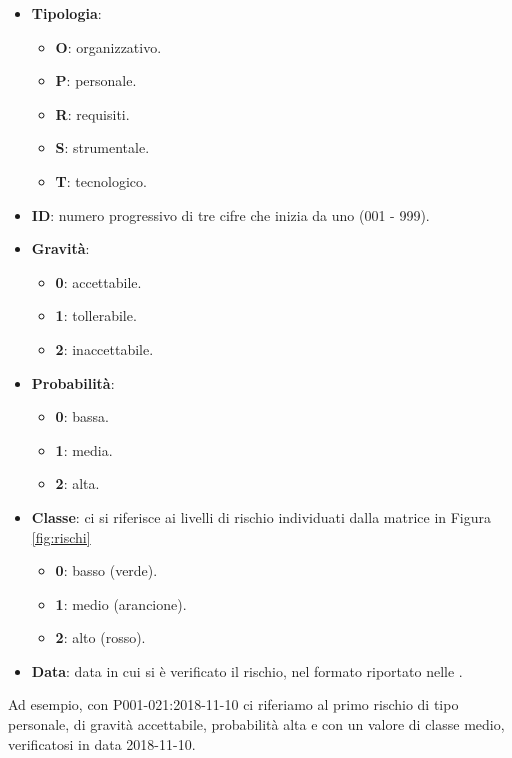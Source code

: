 	\begin{itemize}
		\item \textbf{Tipologia}:
			\begin{itemize}
				\item \textbf{O}: organizzativo.
				\item \textbf{P}: personale.
				\item \textbf{R}: requisiti.
				\item \textbf{S}: strumentale.
				\item \textbf{T}: tecnologico.
			\end{itemize}

		\item \textbf{ID}: numero progressivo di tre cifre che inizia da uno (001 - 999).
		\item \textbf{Gravità}:
			\begin{itemize}
				\item \textbf{0}: accettabile.
				\item \textbf{1}: tollerabile.
				\item \textbf{2}: inaccettabile.
			\end{itemize}

		\item \textbf{Probabilità}:
			\begin{itemize}
				\item \textbf{0}: bassa.
				\item \textbf{1}: media.
				\item \textbf{2}: alta.
			\end{itemize}

		\item \textbf{Classe}: ci si riferisce ai livelli di rischio individuati dalla matrice in Figura \ref{fig:rischi}
			\begin{itemize}
				\item \textbf{0}: basso (verde).
				\item \textbf{1}: medio (arancione).
				\item \textbf{2}: alto (rosso).
			\end{itemize}

		\item \textbf{Data}: data in cui si è verificato il rischio, nel formato riportato nelle \NdPd.
	\end{itemize}

	Ad esempio, con P001-021:2018-11-10 ci riferiamo al primo rischio di tipo personale, di gravità accettabile, probabilità alta e con un valore di classe medio, verificatosi in data 2018-11-10.

